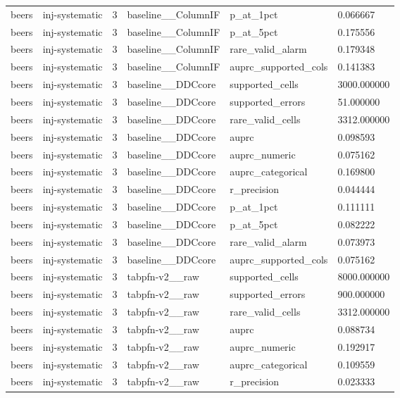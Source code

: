 \begin{tabular}{llllll}
beers & inj-systematic & 3 & baseline\_\_ColumnIF & p\_at\_1pct & 0.066667 \\
beers & inj-systematic & 3 & baseline\_\_ColumnIF & p\_at\_5pct & 0.175556 \\
beers & inj-systematic & 3 & baseline\_\_ColumnIF & rare\_valid\_alarm & 0.179348 \\
beers & inj-systematic & 3 & baseline\_\_ColumnIF & auprc\_supported\_cols & 0.141383 \\
beers & inj-systematic & 3 & baseline\_\_DDCcore & supported\_cells & 3000.000000 \\
beers & inj-systematic & 3 & baseline\_\_DDCcore & supported\_errors & 51.000000 \\
beers & inj-systematic & 3 & baseline\_\_DDCcore & rare\_valid\_cells & 3312.000000 \\
beers & inj-systematic & 3 & baseline\_\_DDCcore & auprc & 0.098593 \\
beers & inj-systematic & 3 & baseline\_\_DDCcore & auprc\_numeric & 0.075162 \\
beers & inj-systematic & 3 & baseline\_\_DDCcore & auprc\_categorical & 0.169800 \\
beers & inj-systematic & 3 & baseline\_\_DDCcore & r\_precision & 0.044444 \\
beers & inj-systematic & 3 & baseline\_\_DDCcore & p\_at\_1pct & 0.111111 \\
beers & inj-systematic & 3 & baseline\_\_DDCcore & p\_at\_5pct & 0.082222 \\
beers & inj-systematic & 3 & baseline\_\_DDCcore & rare\_valid\_alarm & 0.073973 \\
beers & inj-systematic & 3 & baseline\_\_DDCcore & auprc\_supported\_cols & 0.075162 \\
beers & inj-systematic & 3 & tabpfn-v2\_\_raw & supported\_cells & 8000.000000 \\
beers & inj-systematic & 3 & tabpfn-v2\_\_raw & supported\_errors & 900.000000 \\
beers & inj-systematic & 3 & tabpfn-v2\_\_raw & rare\_valid\_cells & 3312.000000 \\
beers & inj-systematic & 3 & tabpfn-v2\_\_raw & auprc & 0.088734 \\
beers & inj-systematic & 3 & tabpfn-v2\_\_raw & auprc\_numeric & 0.192917 \\
beers & inj-systematic & 3 & tabpfn-v2\_\_raw & auprc\_categorical & 0.109559 \\
beers & inj-systematic & 3 & tabpfn-v2\_\_raw & r\_precision & 0.023333 \\

\end{tabular}
